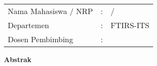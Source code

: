 \thispagestyle{newchap}
\begin{center}
  \large\textbf{\tatitle{}}
\end{center}


\vspace{2ex}

\begingroup
\setlength{\tabcolsep}{0pt}

\noindent
\begin{tabularx}{\textwidth}{l >{\centering}m{2em} X}
  Nama Mahasiswa / NRP   & : & \name{} / \nrp{}        \\

  Departemen 	 		 & : & \department{} FTIRS-ITS \\

  Dosen Pembimbing       & : & \advisor{}   \\
  
\end{tabularx}
\endgroup

\vspace{2ex}

\begingroup
\noindent
\begin{large}
	\textbf{Abstrak}
\end{large}
\endgroup

